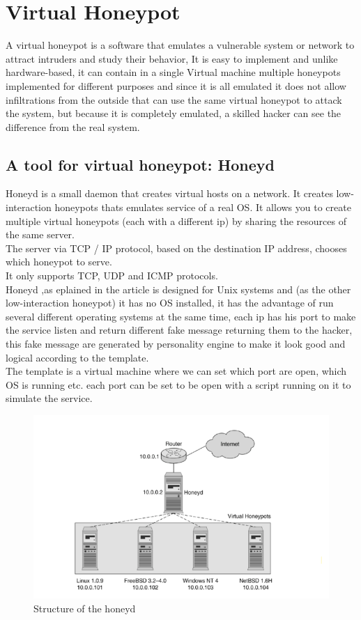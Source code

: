 \section{Virtual Honeypot}
A virtual honeypot is a software that emulates a vulnerable system or network to attract intruders and study their behavior, It is easy to implement and unlike hardware-based, it can contain in a single Virtual machine  multiple honeypots implemented for different purposes and since it is all emulated it does not allow infiltrations from the outside that can use the same virtual honeypot to attack the system, but  because it is completely emulated, a skilled hacker can see the difference from the real system.
\subsection{A tool for virtual honeypot: Honeyd}
Honeyd is a small daemon that creates virtual hosts on a network. It creates low-interaction honeypots thats emulates service of a real OS.
It allows you to create multiple virtual honeypots (each with a different ip) by sharing the resources of the same server.\\
The server via TCP / IP protocol, based on the destination IP address, chooses which honeypot to serve.\\
It only supports TCP, UDP and ICMP protocols.\\
Honeyd ,as eplained in the article \cite{Provos2003HoneydA} is designed for Unix systems and (as the other low-interaction honeypot) it has no OS installed, it has the advantage of run several different operating systems at the same time, each ip has his port to make the service listen and return different fake message returning them to the hacker, this fake message are generated by personality engine to make it look good and logical according to the template.\\
The template is a virtual machine where we can set which port are open, which OS is running etc. each port can be set to be open with a script running on it to simulate the service.\\
\begin{figure}[h!]
  \centering
  \includegraphics{images/honeyd1.png}
  \caption{Structure of the honeyd}
  \label{fig:irradiances}
\end{figure}
